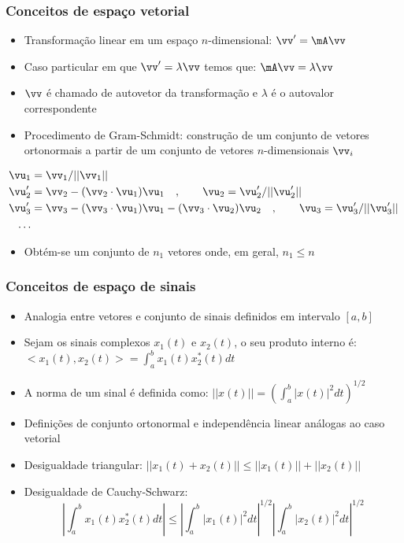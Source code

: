 \begin{frame}
	\frametitle{Conceitos de espaço vetorial}

	\begin{itemize}
	 \item Transformação linear em um espaço $n$-dimensional: $\vv' = \mA \vv$
	  \item Caso particular em que $\vv' = \lambda \vv$ temos que: $\mA \vv = \lambda \vv$
 	  \item $\vv$ é chamado de autovetor da transformação e $\lambda$ é o autovalor correspondente
	  \item Procedimento de Gram-Schmidt: construção de um conjunto de vetores ortonormais a partir de um conjunto de vetores $n$-dimensionais $\vv_i$
	\end{itemize} \vspace{-0.4cm}
	\begin{align*}
	      \vu_1 &= \vv_1 / ||\vv_1|| \\
	      \vu_2' &= \vv_2 - (\vv_2 \cdot \vu_1)\vu_1 \quad , \qquad \vu_2 = \vu_2' / ||\vu_2'|| \\
	      \vu_3' &= \vv_3 - (\vv_3 \cdot \vu_1)\vu_1 - (\vv_3 \cdot \vu_2)\vu_2 \quad , \qquad \vu_3 = \vu_3' / ||\vu_3'|| \\
	      \ldots
	\end{align*} \vspace{-0.5cm}
	\begin{itemize} 
	 \item Obtém-se um conjunto de $n_1$ vetores onde, em geral, $n_1 \leq n$
	\end{itemize}

\end{frame}

\begin{frame}
	\frametitle{Conceitos de espaço de sinais}

	\begin{itemize}
	  \item Analogia entre vetores e conjunto de sinais definidos em intervalo $[a,b]$
	  \item Sejam os sinais complexos $x_1(t)$ e $x_2(t)$, o seu produto interno é: $<x_1(t),x_2(t)> = \int_a^b x_1(t) x_2^*(t) dt$
	  \item A norma de um sinal é definida como: $||x(t)|| = \left( \int_a^b |x(t)|^2 dt \right)^{1/2}$
	  \item Definições de conjunto ortonormal e independência linear análogas ao caso vetorial
	  \item Desigualdade triangular: $||x_1(t) + x_2(t)|| \leq ||x_1(t)|| + ||x_2(t)||$
	  \item Desigualdade de Cauchy-Schwarz: 
	  \begin{equation*}
		    \left|\int_a^b x_1(t) x_2^*(t) dt \right| \leq \left|\int_a^b |x_1(t)|^2 dt \right|^{1/2} \left|\int_a^b |x_2(t)|^2 dt\right|^{1/2}
	  \end{equation*}
	\end{itemize}

\end{frame}

